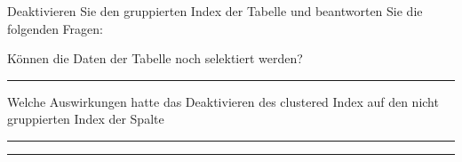 \item Deaktivieren Sie den gruppierten Index der Tabelle 
und beantworten Sie die folgenden Fragen:

Können die Daten der Tabelle  noch selektiert werden?

  \rule{0.94\textwidth}{0.5pt}

Welche Auswirkungen hatte das Deaktivieren des clustered Index auf den nicht
gruppierten Index der Spalte 

  \rule{0.94\textwidth}{0.5pt}

  \rule{0.94\textwidth}{0.5pt}


